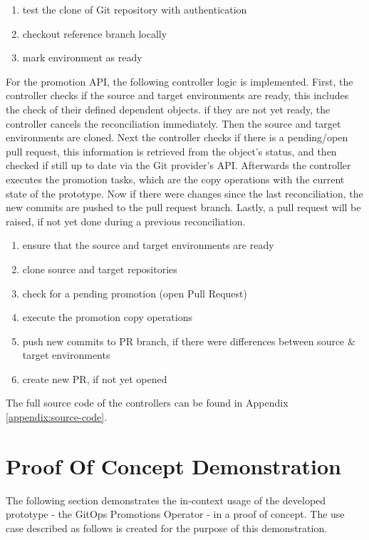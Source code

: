 \begin{enumerate}
	\item test the clone of Git repository with authentication
	\item checkout reference branch locally
	\item mark environment as ready
\end{enumerate}

For the promotion API,
the following controller logic is implemented.
First, the controller checks if the source and target environments are ready,
this includes the check of their defined dependent objects.
if they are not yet ready, the controller cancels the reconciliation immediately.
Then the source and target environments are cloned.
Next the controller checks if there is a pending/open pull request,
this information is retrieved from the object's status, and then checked
if still up to date via the Git provider's API.
Afterwards the controller executes the promotion tasks,
which are the copy operations with the current state of the prototype.
Now if there were changes since the last reconciliation, the new commits
are pushed to the pull request branch.
Lastly, a pull request will be raised, if not yet done during a previous reconciliation.

\begin{enumerate}
	\item ensure that the source and target environments are ready
	\item clone source and target repositories
	\item check for a pending promotion (open Pull Request)
	\item execute the promotion copy operations
	\item push new commits to PR branch, if there were differences between source \& target environments
	\item create new PR, if not yet opened
\end{enumerate}

The full source code of the controllers can be found in Appendix
\ref{appendix:source-code}.






\section{Proof Of Concept Demonstration}

The following section demonstrates the in-context usage of the
developed prototype - the GitOps Promotions Operator - in a proof of concept.
The use case described as follows is created for the purpose of this demonstration.

